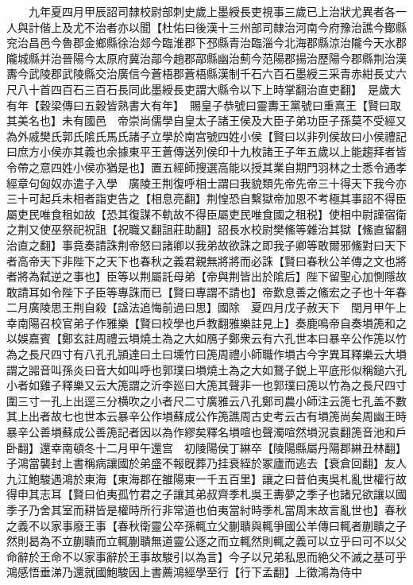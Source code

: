 　　九年夏四月甲辰詔司隸校尉部刺史歲上墨綬長吏視事三歲已上治狀尤異者各一人與計偕上及尤不治者亦以聞【杜佑曰後漢十三州部司隸治河南今府豫治譙今鄼縣兖治昌邑今魯郡金鄉縣徐治郯今臨淮郡下邳縣青治臨淄今北海郡縣涼治隴今天水郡隴城縣并治晉陽今太原府冀治鄗今趙郡鄗縣幽治薊今范陽郡揚治歷陽今郡縣荆治漢夀今武陵郡武陵縣交治廣信今蒼梧郡蒼梧縣漢制千石六百石墨綬三采青赤紺長丈六尺八十首四百石三百石長同此墨綬長吏謂大縣令以下上時掌翻治直吏翻】　是歲大有年【穀梁傳曰五穀皆熟書大有年】　賜皇子恭號曰靈夀王黨號曰重熹王【賢曰取其美名也】未有國邑　帝崇尚儒學自皇太子諸王侯及大臣子弟功臣子孫莫不受經又為外戚樊氏郭氏隂氏馬氏諸子立學於南宫號四姓小侯【賢曰以非列侯故曰小侯禮記曰庶方小侯亦其義也余據東平王蒼傳送列侯印十九枚諸王子年五歲以上能趨拜者皆令帶之意四姓小侯亦猶是也】置五經師搜選高能以授其業自期門羽林之士悉令通孝經章句匈奴亦遣子入學　廣陵王荆復呼相士謂曰我貌類先帝先帝三十得天下我今亦三十可起兵未相者詣吏告之【相息亮翻】荆惶恐自繫獄帝加恩不考極其事詔不得臣屬吏民唯食租如故【恐其復謀不軌故不得臣屬吏民唯食國之租税】使相中尉謹宿衛之荆又使巫祭祀祝詛【祝職又翻詛莊助翻】詔長水校尉樊鯈等雜治其獄【鯈直留翻治直之翻】事竟奏請誅荆帝怒曰諸卿以我弟故欲誅之即我子卿等敢爾邪鯈對曰天下者高帝天下非陛下之天下也春秋之義君親無將將而必誅【賢曰春秋公羊傳之文也將者將為弑逆之事也】臣等以荆屬託母弟【帝與荆皆出於隂后】陛下留聖心加惻隱故敢請耳如令陛下子臣等專誅而已【賢曰專謂不請也】帝歎息善之鯈宏之子也十年春二月廣陵思王荆自殺【諡法追悔前過曰思】國除　夏四月戊子赦天下　閏月甲午上幸南陽召校官弟子作雅樂【賢曰校學也戶教翻雅樂註見上】奏鹿鳴帝自奏塤箎和之以娛嘉賓【鄭玄註周禮云塤燒土為之大如鴈子鄭衆云有六孔世本曰暴辛公作箎以竹為之長尺四寸有八孔孔頴達曰土曰壎竹曰箎周禮小師職作塤古今字異耳釋樂云大塤謂之嘂音叫孫炎曰音大如叫呼也郭璞曰塤燒土為之大如鵞子鋭上平底形似稱鎚六孔小者如雞子釋樂又云大箎謂之沂李廵曰大箎其聲非一也郭璞曰箎以竹為之長尺四寸圍三寸一孔上出逕三分横吹之小者尺二寸廣雅云八孔鄭司農小師注云箎七孔盖不數其上出者故七也世本云暴辛公作塤蘇成公作箎譙周古史考云古有塤箎尚矣周幽王時暴辛公善塤蘇成公善箎記者因以為作繆矣釋名塤喧也聲濁喧然塤況袁翻箎音池和戶卧翻】還幸南頓冬十二月甲午還宫　初陵陽侯丁綝卒【陵陽縣屬丹陽郡綝丑林翻】子鴻當襲封上書稱病讓國於弟盛不報旣葬乃挂衰絰於冢廬而逃去【衰倉回翻】友人九江鮑駿遇鴻於東海【東海郡在雒陽東一千五百里】讓之曰昔伯夷吳札亂世權行故得申其志耳【賢曰伯夷孤竹君之子讓其弟叔齊季札吳王夀夢之季子也諸兄欲讓以國季子乃舍其室而耕皆是權時所行非常道也伯夷當紂時季札當周末故言亂世也】春秋之義不以家事廢王事【春秋衛靈公卒孫輒立父蒯聵與輒爭國公羊傳曰輒者蒯聵之子然則曷為不立蒯聵而立輒蒯聵無道靈公逐之而立輒然則輒之義可以立乎曰可不以父命辭於王命不以家事辭於王事故駿引以為言】今子以兄弟私恩而絶父不滅之基可乎鴻感悟垂涕乃還就國鮑駿因上書薦鴻經學至行【行下孟翻】上徵鴻為侍中

